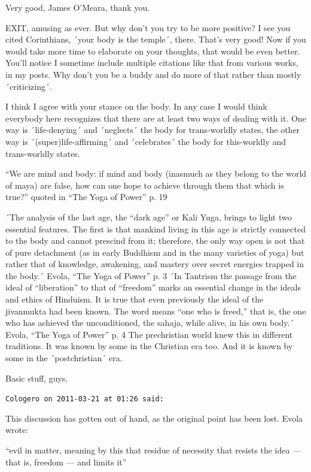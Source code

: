 \begin{footnotesize}
\begin{sffamily}
Very good, James O'Meara, thank you.

EXIT, amusing as ever. But why don't you try to be more positive? I see you cited Corinthians, ´your body is the temple´, there. That's very good! Now if you would take more time to elaborate on your thoughts, that would be even better. You'll notice I sometime include multiple citations like that from various works, in my posts. Why don't you be a buddy and do more of that rather than mostly ´criticizing´.

I think I agree with your stance on the body. In any case I would think everybody here recognizes that there are at least two ways of dealing with it. One way is ´life-denying´ and ´neglects´ the body for trans-worldly states, the other way is ´(super)life-affirming´ and ´celebrates´ the body for this-worldly and trans-worldly states.

``We are mind and body: if mind and body (inasmuch as they belong to the world of maya) are false, how can one hope to achieve through them that which is true?'' quoted in ``The Yoga of Power'' p. 19 

´The analysis of the last age, the ``dark age'' or Kali Yuga, brings to light two essential features. The first is that mankind living in this age is strictly connected to the body and cannot prescind from it; therefore, the only way open is not that of pure detachment (as in early Buddhism and in the many varieties of yoga) but rather that of knowledge, awakening, and mastery over secret energies trapped in the body.´ Evola, ``The Yoga of Power'' p. 3 ´In Tantrism the passage from the ideal of ``liberation'' to that of ``freedom'' marks an essential change in the ideals and ethics of Hinduism. It is true that even previously the ideal of the jivanmukta had been known. The word means ``one who is freed,'' that is, the one who has achieved the unconditioned, the sahaja, while alive, in his own body.´ Evola, ``The Yoga of Power'' p. 4 The prechristian world knew this in different traditions. It was known by some in the Christian era too. And it is known by some in the ´postchristian´ era.

Basic stuff, guys.

\hfill

\texttt{Cologero on 2011-03-21 at 01:26 said:}

This discussion has gotten out of hand, as the original point has been lost. Evola wrote:

``evil in matter, meaning by this that residue of necessity that resists the idea --- that is, freedom --- and limits it''


\end{sffamily}
\end{footnotesize}
